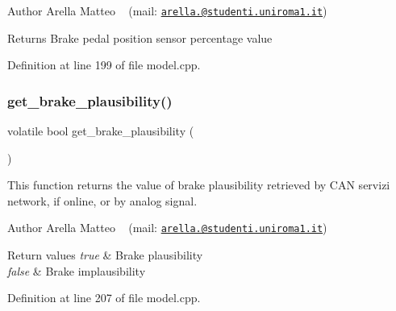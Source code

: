 \begin{DoxyAuthor}{Author}
Arella Matteo ~\newline
 (mail\+: \href{mailto:arella.1646983@studenti.uniroma1.it}{\tt arella.@studenti.\+uniroma1.\+it})
\end{DoxyAuthor}
\begin{DoxyReturn}{Returns}
Brake pedal position sensor percentage value 
\end{DoxyReturn}


Definition at line 199 of file model.\+cpp.

\mbox{\label{group___board__model__group_gad47b702f79115e19d75b22f39b45efeb}} 
\subsubsection{\texorpdfstring{get\+\_\+brake\+\_\+plausibility()}{get\_brake\_plausibility()}}
{\footnotesize\ttfamily volatile bool get\+\_\+brake\+\_\+plausibility (\begin{DoxyParamCaption}{ }\end{DoxyParamCaption})}



This function returns the value of brake plausibility retrieved by C\+AN servizi network, if online, or by analog signal. 

\begin{DoxyAuthor}{Author}
Arella Matteo ~\newline
 (mail\+: \href{mailto:arella.1646983@studenti.uniroma1.it}{\tt arella.@studenti.\+uniroma1.\+it})
\end{DoxyAuthor}

\begin{DoxyRetVals}{Return values}
{\em true} & Brake plausibility \\
\hline
{\em false} & Brake implausibility \\
\hline
\end{DoxyRetVals}


Definition at line 207 of file model.\+cpp.

\mbox{\label{group___board__model__group_ga36eddbc000c8d1820fd2a644a39c87ea}} 
